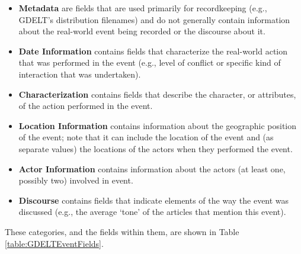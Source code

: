 \begin{itemize}
  \item \textbf{Metadata} are fields that are used primarily for recordkeeping (e.g., GDELT's distribution filenames) and do not generally contain information about the real-world event being recorded or the discourse about it.
  \item \textbf{Date Information} contains fields that characterize the real-world action that was performed in the event (e.g., level of conflict or specific kind of interaction that was undertaken).
  \item \textbf{Characterization} contains fields that describe the character, or attributes, of the action performed in the event.
  \item \textbf{Location Information} contains information about the geographic position of the event; note that it can include the location of the event and (as separate values) the locations of the actors when they performed the event.
    \item \textbf{Actor Information} contains information about the actors (at least one, possibly two) involved in event.
  \item \textbf{Discourse} contains fields that indicate elements of the way the event was discussed (e.g., the average `tone' of the articles that mention this event).
\end{itemize}

\par These categories, and the fields within them, are shown in Table \ref{table:GDELTEventFields}.

